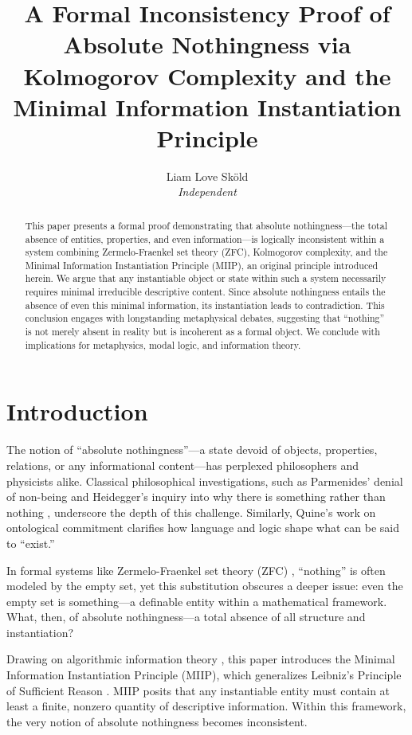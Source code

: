 \documentclass[12pt,a4paper]{article}
\title{A Formal Inconsistency Proof of Absolute Nothingness via Kolmogorov Complexity and the Minimal Information Instantiation Principle}
\author{Liam Love Sköld\\\textit{Independent}}
\date{}
\begin{document}
\maketitle

\begin{abstract}
This paper presents a formal proof demonstrating that absolute nothingness---the total absence of entities, properties, and even information---is logically inconsistent within a system combining Zermelo-Fraenkel set theory (ZFC), Kolmogorov complexity, and the Minimal Information Instantiation Principle (MIIP), an original principle introduced herein. We argue that any instantiable object or state within such a system necessarily requires minimal irreducible descriptive content. Since absolute nothingness entails the absence of even this minimal information, its instantiation leads to contradiction. This conclusion engages with longstanding metaphysical debates, suggesting that ``nothing'' is not merely absent in reality but is incoherent as a formal object. We conclude with implications for metaphysics, modal logic, and information theory.
\end{abstract}

\section{Introduction}

The notion of ``absolute nothingness''---a state devoid of objects, properties, relations, or any informational content---has perplexed philosophers and physicists alike. Classical philosophical investigations, such as Parmenides’ denial of non-being and Heidegger’s inquiry into why there is something rather than nothing \cite{Heidegger1962}, underscore the depth of this challenge. Similarly, Quine’s work on ontological commitment \cite{Quine1948} clarifies how language and logic shape what can be said to ``exist.''

In formal systems like Zermelo-Fraenkel set theory (ZFC) \cite{Jech2003}, ``nothing'' is often modeled by the empty set, yet this substitution obscures a deeper issue: even the empty set is something---a definable entity within a mathematical framework. What, then, of absolute nothingness---a total absence of all structure and instantiation?

Drawing on algorithmic information theory \cite{Kolmogorov1965, Chaitin1966, LiVitanyi2008}, this paper introduces the Minimal Information Instantiation Principle (MIIP), which generalizes Leibniz’s Principle of Sufficient Reason \cite{Leibniz1714}. MIIP posits that any instantiable entity must contain at least a finite, nonzero quantity of descriptive information. Within this framework, the very notion of absolute nothingness becomes inconsistent.
\end{document}
